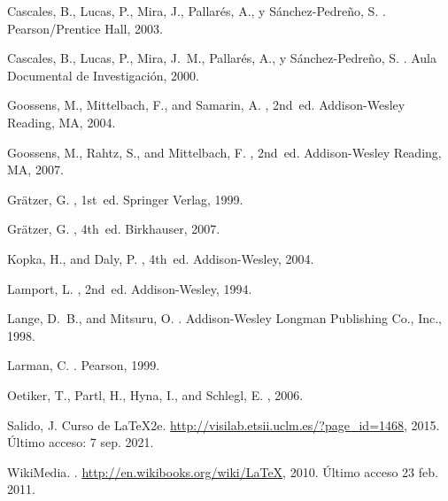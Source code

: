 \begin{thebibliography}{10}

{\sc Cascales, B., Lucas, P., Mira, J., Pallarés, A., y {Sánchez-Pedreño},
  S.}
.
\newblock Pearson/Prentice Hall, 2003.

{\sc Cascales, B., Lucas, P., Mira, J.~M., Pallarés, A., y
  Sánchez-Pedreño, S.}
.
\newblock Aula Documental de Investigación, 2000.

{\sc Goossens, M., Mittelbach, F., and Samarin, A.}
, 2nd~ed.
\newblock Addison-Wesley Reading, MA, 2004.

{\sc Goossens, M., Rahtz, S., and Mittelbach, F.}
, 2nd~ed.
\newblock Addison-Wesley Reading, MA, 2007.

{\sc Grätzer, G.}
, 1st~ed.
\newblock Springer Verlag, 1999.

{\sc Grätzer, G.}
, 4th~ed.
\newblock Birkhauser, 2007.

{\sc Kopka, H., and Daly, P.}
, 4th~ed.
\newblock Addison-Wesley, 2004.

{\sc Lamport, L.}
, 2nd~ed.
\newblock Addison-Wesley, 1994.

{\sc Lange, D.~B., and Mitsuru, O.}
.
\newblock Addison-Wesley Longman Publishing Co., Inc., 1998.

{\sc Larman, C.}
.
\newblock Pearson, 1999.

{\sc Oetiker, T., Partl, H., Hyna, I., and Schlegl, E.}
, 2006.

{\sc Salido, J.}
\newblock Curso de {\LaTeX2e{}}.
 \url{http://visilab.etsii.uclm.es/?page_id=1468}, 2015.
\newblock Último acceso: 7 sep. 2021.

{\sc WikiMedia}.
.
 \url{http://en.wikibooks.org/wiki/LaTeX}, 2010.
\newblock Último acceso 23 feb. 2011.

\end{thebibliography}
